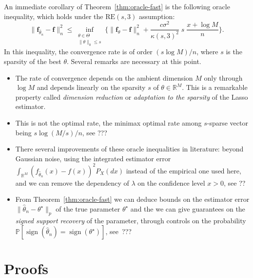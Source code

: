 \documentclass[
	fontsize=11pt, %
	twoside=false, %
	numbers=noenddot, %
]{kaobook}
\renewcommand{\bf}{{\boldsymbol f}}
\renewcommand{\P}{\mathbb P}
\newcommand{\R}{\mathbb R}
\newcommand{\wh}{\widehat}
\newcommand{\norm}[1]{\| #1 \|}
\DeclareMathOperator{\sign}{sign}
\begin{document}
An immediate corollary of Theorem~\ref{thm:oracle-fast} is the following oracle inequality, which holds under the $\text{RE}(s, 3)$ assumption:
\begin{equation*}
	\norm{\bf_{\wh \theta_n} - \bf}_n^2 \leq 
	\inf_{\substack{\theta \in \Theta \\ \norm{\theta}_0 \leq s}}
	\bigg\{ \norm{\bf_{\theta} - \bf}_n^2  + \frac{c \sigma^2}{\kappa(s, 3)^2} 
	\; s \; \frac{x + \log M}{n} \bigg\}.
\end{equation*}
In this inequality, the convergence rate is of order $(s \log M) / n$, where $s$ is the sparsity of the best $\theta$.
Several remarks are necessary at this point.
\begin{itemize}
	\item The rate of convergence depends on the ambient dimension $M$ only through $\log M$ and depends linearly on the sparsity $s$ of $\theta \in \R^M$. This is a remarkable property called \emph{dimension reduction} or \emph{adaptation to the sparsity} of the Lasso estimator.
	\item This is not the optimal rate, the minimax optimal rate among $s$-sparse vector being $s \log(M / s) / n$, see ???
	\item There several improvements of these oracle inequalities in literature: beyond Gaussian noise, using the integrated estimator error $\int_{\R^M} (f_{\wh \theta_n}(x) - f(x))^2 P_X(dx)$ instead of the empirical one used here, and we can remove the dependency of $\lambda$ on the confidence level $x > 0$, see ??
	\item From Theorem~\ref{thm:oracle-fast} we can deduce bounds on the estimator error $\norm{\wh \theta_n - \theta^\star}_p$ of the true parameter $\theta^\star$ and the we can give guarantees on the \emph{signed support recovery} of the parameter, through controls on the probability 
	$\P[ \sign(\wh \theta_n) = \sign(\theta^\star)]$, see~???
\end{itemize}

\section{Proofs} %
\label{sec:lasso-proofs}
\end{document}

